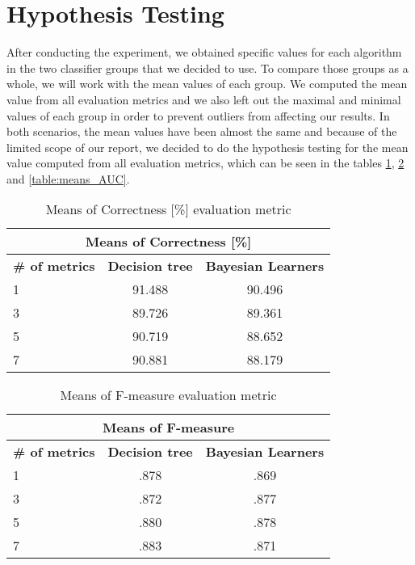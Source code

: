 \section{Hypothesis Testing}
After conducting the experiment, we obtained specific values for each algorithm in the two classifier groups that we decided to use. To compare those groups as a whole, we will work with the mean values of each group. We computed the mean value from all evaluation metrics and we also left out the maximal and minimal values of each group in order to prevent outliers from affecting our results. In both scenarios, the mean values have been almost the same and because of the limited scope of our report, we decided to do the hypothesis testing for the mean value computed from all evaluation metrics, which can be seen in the tables \ref{table:means_correct}, \ref{table:means_F-measure} and \ref{table:means_AUC}.
\begin{table}[h!]
\centering
\begin{tabular}{ |l|c|c| }
\hline
\multicolumn{3}{|c|}{\textbf{Means of Correctness [\%]}}\\
 \hline
 \textbf{\# of metrics} & \textbf{Decision tree} & \textbf{Bayesian Learners}  \\
 \hline
 1 & 91.488 & 90.496\\
 \hline
 3 &  89.726 & 89.361\\
 \hline
 5 & 90.719 & 88.652\\
 \hline
 7 & 90.881 &  88.179\\
 \hline
\end{tabular}
\caption{Means of Correctness [\%] evaluation metric}
\label{table:means_correct}
\end{table} 

\begin{table}[h!]
\centering
\begin{tabular}{ |l|c|c| }
 \hline
 \multicolumn{3}{|c|}{\textbf{Means of F-measure}}\\ \hline
 \textbf{\# of metrics} & \textbf{Decision tree} & \textbf{Bayesian Learners}  \\
 \hline
 1 & .878 & .869\\
 \hline
 3 &  .872 & .877\\
 \hline
 5 & .880 & .878\\
 \hline
 7 & .883 &  .871\\
 \hline
\end{tabular}
\caption{Means of F-measure evaluation metric}
\label{table:means_F-measure}
\end{table} 


